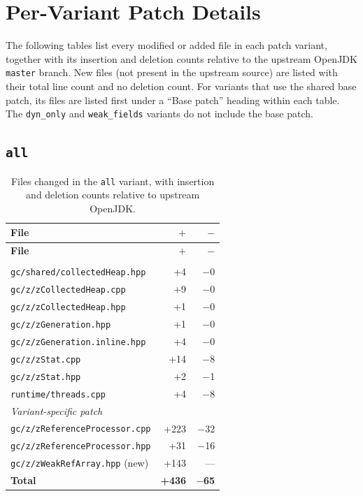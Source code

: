 

\chapter{Per-Variant Patch Details}
\label{app:patch-details}

The following tables list every modified or added file in each patch variant, together with its insertion and deletion counts relative to the upstream OpenJDK \texttt{master} branch. New files (not present in the upstream source) are listed with their total line count and no deletion count. For variants that use the shared base patch, its files are listed first under a ``Base patch'' heading within each table. The \texttt{dyn\_only} and \texttt{weak\_fields} variants do not include the base patch.

\section{\texttt{all}}

\begin{longtable}[c]{lrr}
\caption[File changes in \texttt{all}]{Files changed in the \texttt{all} variant, with insertion and deletion counts relative to upstream OpenJDK.} \label{tab:patch-all} \\
\toprule
\textbf{File} & \textbf{$+$} & \textbf{$-$} \\
\midrule
\endfirsthead
\toprule
\textbf{File} & \textbf{$+$} & \textbf{$-$} \\
\midrule
\endhead
\bottomrule
\endfoot
\multicolumn{3}{l}{\textit{Base patch}} \\
\texttt{gc/shared/collectedHeap.hpp}     & +4  & $-$0 \\
\texttt{gc/z/zCollectedHeap.cpp}         & +9  & $-$0 \\
\texttt{gc/z/zCollectedHeap.hpp}         & +1  & $-$0 \\
\texttt{gc/z/zGeneration.hpp}            & +1  & $-$0 \\
\texttt{gc/z/zGeneration.inline.hpp}     & +4  & $-$0 \\
\texttt{gc/z/zStat.cpp}                  & +14 & $-$8 \\
\texttt{gc/z/zStat.hpp}                  & +2  & $-$1 \\
\texttt{runtime/threads.cpp}             & +4  & $-$8 \\
\multicolumn{3}{l}{\textit{Variant-specific patch}} \\
\texttt{gc/z/zReferenceProcessor.cpp}   & +223 & $-$32 \\
\texttt{gc/z/zReferenceProcessor.hpp}   & +31  & $-$16 \\
\texttt{gc/z/zWeakRefArray.hpp} (new)   & +143 & --- \\
\midrule
\textbf{Total} & \textbf{+436} & \textbf{$-$65} \\
\end{longtable}


